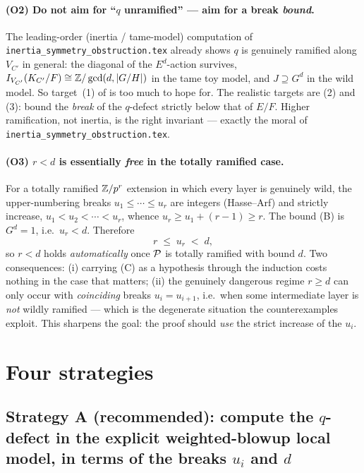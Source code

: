\documentclass[11pt]{article}
\begin{document}
\paragraph{(O2) Do not aim for ``$q$ unramified'' --- aim for a break
\emph{bound}.}
The leading-order (inertia / tame-model) computation of
\texttt{inertia\_symmetry\_obstruction.tex} already shows
$q$ is genuinely ramified along $V_{C'}$ in general: the diagonal of the
$E^d$-action survives, $I_{V_{C'}}(K_{C'}/F)\cong\mathbb{Z}/\gcd(d,|G/H|)$ in the tame
toy model, and $J\supseteq G^d$ in the wild model. So target~(1) of
 is too much to hope for. The realistic targets are (2) and
(3): bound the \emph{break} of the $q$-defect strictly below that of $E/F$.
Higher ramification, not inertia, is the right invariant --- exactly the moral
of \texttt{inertia\_symmetry\_obstruction.tex}.

\paragraph{(O3) $r<d$ is essentially \emph{free} in the totally ramified case.}
For a totally ramified $\mathbb{Z}/p^r$ extension in which every layer is genuinely wild,
the upper-numbering breaks $u_1\le\cdots\le u_r$ are integers (Hasse--Arf) and
strictly increase, $u_1<u_2<\cdots<u_r$, whence $u_r\ge u_1+(r-1)\ge r$. The
bound (B) is $G^d=1$, i.e.\ $u_r<d$. Therefore
\[
r\;\le\;u_r\;<\;d ,
\]
so $r<d$ holds \emph{automatically} once $\mathcal{P}$ is totally ramified with bound
$d$. Two consequences: (i) carrying (C) as a hypothesis through the induction
costs nothing in the case that matters; (ii) the genuinely dangerous regime
$r\ge d$ can only occur with \emph{coinciding} breaks $u_i=u_{i+1}$, i.e.\ when
some intermediate layer is \emph{not} wildly ramified --- which is the
degenerate situation the counterexamples exploit. This sharpens the goal: the
proof should \emph{use} the strict increase of the $u_i$.

\section{Four strategies}\label{sec:strategies}

\subsection*{Strategy A (recommended): compute the $q$-defect in the explicit
weighted-blowup local model, in terms of the breaks $u_i$ and $d$}
\end{document}
